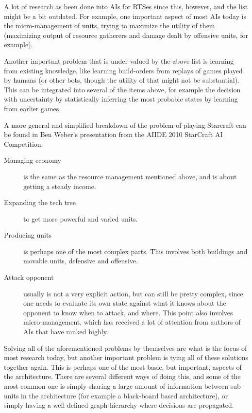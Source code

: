 A lot of research as been done into AIs for RTSes since this, however, and the
list might be a bit outdated. For example, one important aspect of most AIs
today is the micro-management of units, trying to maximize the utility of them 
(maximizing output of resource gatherers and damage dealt by offensive units,
for example).

Another important problem that is under-valued by the above list is learning
from existing knowledge, like learning build-orders from replays of games played
by humans (or other bots, though the utility of that might not be substantial).
This can be integrated into several of the items above, for example the decision
with uncertainty by statistically inferring the most probable states by
learning from earlier games.

A more general and simplified breakdown of the problem of playing Starcraft can
be found in Ben Weber's presentation from the AIIDE 2010 StarCraft AI
Competition:\cite{weber2010aiide}

\begin{description}
  \item [Managing economy] is the same as the resource management mentioned
    above, and is about getting a steady income.
  \item [Expanding the tech tree] to get more powerful and varied units.
  \item [Producing units] is perhaps one of the most complex parts. This
    involves both buildings and movable units, defensive and offensive.
  \item [Attack opponent] usually is not a very explicit action, but can still
    be pretty complex, since one needs to evaluate its own state against what
    it knows about the opponent to know when to attack, and where. This point
    also involves micro-management, which has received a lot of attention from 
    authors of AIs that have ranked highly.
\end{description}

Solving all of the aforementioned problems by themselves are what is the focus
of most research today, but another important problem is tying all of these
solutions together again. This is perhaps one of the most basic, but important,
aspects of the architecture. There are several different ways of doing this,
and some of the most common one is simply sharing a large amount of information
between sub-units in the architecture (for example a black-board based
architecture), or simply having a well-defined graph hierarchy where decisions
are propagated.

